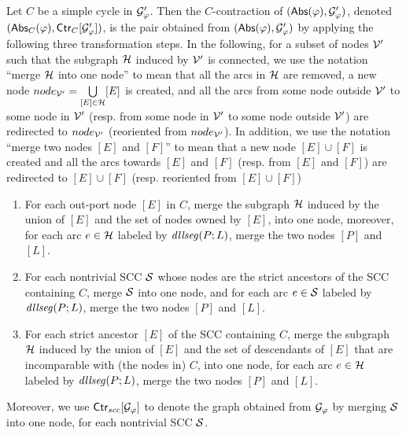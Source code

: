 \documentclass{llncs}
\begin{document}

\begin{definition}\label{def-ctr}
Let $C$ be a simple cycle in $\mathcal{G}'_\varphi$. Then the $C$-contraction of $({\sf Abs}(\varphi), \mathcal{G}'_\varphi)$, denoted $({\sf Abs}_C(\varphi), {\sf Ctr}_{C}[\mathcal{G}'_\varphi])$, is the pair obtained from $({\sf Abs}(\varphi), \mathcal{G}'_\varphi)$ by applying the following three transformation steps.
%
In the following, for a subset of nodes $\mathcal{V}'$ such that the subgraph $\mathcal{H}$ induced by $\mathcal{V}'$ is connected, we use the notation ``merge $\mathcal{H}$ into one node'' to mean that all the arcs in $\mathcal{H}$ are removed, a new node $node_{\mathcal{V}'} = \bigcup \limits_{[E] \in \mathcal{H}} [E]$ is created, and all the arcs from some node outside $\mathcal{V}'$ to some node in $\mathcal{V}'$ (resp. from some node in $\mathcal{V}'$ to some node outside $\mathcal{V}'$) are redirected to $node_{\mathcal{V}'}$ (reoriented from $node_{\mathcal{V}'}$). In addition, we use the notation ``merge two nodes $[E]$ and $[F]$'' to mean that a new node $[E] \cup [F]$ is created and all the arcs towards $[E]$ and $[F]$ (resp. from $[E]$ and $[F]$) are redirected to $[E] \cup [F]$ (resp. reoriented from $[E] \cup [F]$)
\begin{enumerate}
\item For each out-port node $[E]$ in $C$, merge the subgraph $\mathcal{H}$ induced by the union of $[E]$ and the set of nodes owned by $[E]$, into one node, moreover, for each arc $e \in \mathcal{H}$ labeled by $\mathit{dllseg}(P; L)$, merge the two nodes $[P]$ and $[L]$.

\item For each nontrivial SCC $\mathcal{S}$ whose nodes are the strict ancestors of the SCC containing $C$, merge $\mathcal{S}$ into one node, and for each arc $e \in \mathcal{S}$ labeled by $\mathit{dllseg}(P; L)$, merge the two nodes $[P]$ and $[L]$.

\item For each strict ancestor $[E]$ of the SCC containing $C$, merge the subgraph $\mathcal{H}$ induced by the union of $[E]$ and the set of descendants of $[E]$ that are incomparable with (the nodes in) $C$, into one node, for each arc $e \in \mathcal{H}$ labeled by $\mathit{dllseg}(P; L)$, merge the two nodes $[P]$ and $[L]$.
\end{enumerate}

Moreover, we use $ {\sf Ctr}_{scc}[\mathcal{G}_\varphi]$ to denote the graph obtained from $ \mathcal{G}_\varphi$ by merging $\mathcal{S}$ into one node, for each nontrivial SCC $\mathcal{S}$.
\end{definition}
\end{document}
